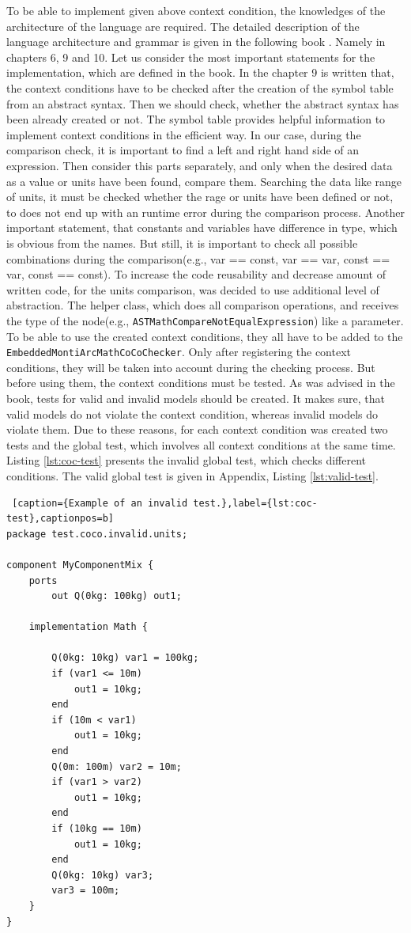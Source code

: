To be able to implement given above context condition, the knowledges of the architecture of the language are required. The detailed description of the language architecture and grammar is given in the following book \cite{HR17}. Namely in chapters 6, 9 and 10. Let us consider the most important statements for the implementation, which are defined in the book. In the chapter 9 is written that, the context conditions have to be checked after the creation of the symbol table from an abstract syntax. Then we should check, whether the abstract syntax has been already created or not. The symbol table provides helpful information to implement context conditions in the efficient way. In our case, during the comparison check, it is important to find a left and right hand side of an expression. Then consider this parts separately, and only when the desired data as a value or units have been found, compare them. Searching the data like range of units, it must be checked whether the rage or units have been defined or not, to does not end up with an runtime error during the comparison process. Another important statement, that constants and variables have difference in type, which is obvious from the names. But still, it is important to check all possible combinations during the comparison(e.g., var == const, var == var, const == var, const == const). To increase the code reusability and decrease amount of written code, for the units comparison, was decided to use additional level of abstraction. The helper class, which does all comparison operations, and receives the type of the node(e.g., \texttt{ASTMathCompareNotEqualExpression}) like a parameter. \newline
To be able to use the created context conditions, they all have to be added to the \texttt{EmbeddedMontiArcMathCoCoChecker}. Only after registering the context conditions, they will be taken into account during the checking process. But before using them, the context conditions must be tested. As was advised in the book, tests for valid and invalid models should be created. It makes sure, that valid models do not violate the context condition, whereas invalid models do violate them. Due to these reasons, for each context condition was created two tests and the global test, which involves all context conditions at the same time. Listing \ref{lst:coc-test} presents the invalid global test, which checks different conditions. The valid global test is given in Appendix, Listing \ref{lst:valid-test}.
\bigskip
\begin{lstlisting} [caption={Example of an invalid test.},label={lst:coc-test},captionpos=b]
package test.coco.invalid.units;

component MyComponentMix {
    ports
        out Q(0kg: 100kg) out1;

    implementation Math {

        Q(0kg: 10kg) var1 = 100kg;
        if (var1 <= 10m)              
            out1 = 10kg;
        end
        if (10m < var1)
            out1 = 10kg;
        end
        Q(0m: 100m) var2 = 10m;
        if (var1 > var2)
            out1 = 10kg;
        end
        if (10kg == 10m)
            out1 = 10kg;
        end
        Q(0kg: 10kg) var3;
        var3 = 100m;
    }
}
\end{lstlisting}

